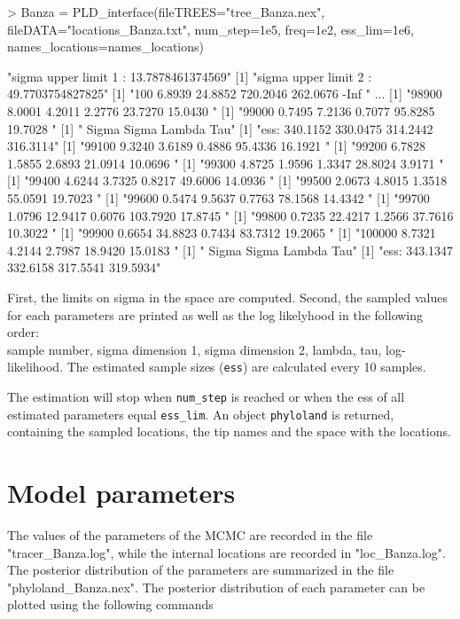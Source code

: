 \documentclass[a4paper]{article}
\begin{document}
\begin{Schunk}
\begin{Sinput}
> Banza = PLD_interface(fileTREES="tree_Banza.nex", fileDATA="locations_Banza.txt",
 num_step=1e5, freq=1e2, ess_lim=1e6, names_locations=names_locations)
\end{Sinput}

\begin{Soutput}
[1] "sigma upper limit 1 : 13.7878461374569"
[1] "sigma upper limit 2 : 49.7703754827825"
[1] "100     6.8939     24.8852     720.2046     262.0676     -Inf    "
...
[1] "98900     8.0001     4.2011     2.2776     23.7270     15.0430    "
[1] "99000     0.7495     7.2136     0.7077     95.8285     19.7028    "
[1] "             Sigma        Sigma        Lambda      Tau"
[1] "ess:     340.1152     330.0475     314.2442    316.3114"
[1] "99100     9.3240     3.6189     0.4886     95.4336     16.1921    "
[1] "99200     6.7828     1.5855     2.6893     21.0914     10.0696    "
[1] "99300     4.8725     1.9596     1.3347     28.8024     3.9171    "
[1] "99400     4.6244     3.7325     0.8217     49.6006     14.0936    "
[1] "99500     2.0673     4.8015     1.3518     55.0591     19.7023    "
[1] "99600     0.5474     9.5637     0.7763     78.1568     14.4342    "
[1] "99700     1.0796     12.9417     0.6076     103.7920     17.8745    "
[1] "99800     0.7235     22.4217     1.2566     37.7616     10.3022    "
[1] "99900     0.6654     34.8823     0.7434     83.7312     19.2065    "
[1] "100000     8.7321     4.2144     2.7987     18.9420     15.0183    "
[1] "             Sigma        Sigma        Lambda      Tau"
[1] "ess:     343.1347     332.6158     317.5541    319.5934"
\end{Soutput}
\end{Schunk}

First, the limits on sigma in the space are computed.
Second, the sampled values for each parameters are printed as well as the log likelyhood in the following order:\\
sample number, sigma dimension 1, sigma dimension 2, lambda, tau, log-likelihood.
The estimated sample sizes (\texttt{ess}) are calculated every 10 samples.

The estimation will stop when \texttt{num\_step} is reached or when the ess of all estimated parameters equal \texttt{ess\_lim}.
An object \texttt{phyloland} is returned, containing the sampled locations, the tip names and the space with the locations.

\newpage
\section{Model parameters}
\hspace{12pt} The values of the parameters of the MCMC are recorded in the file "tracer\_Banza.log", while the internal locations are recorded in "loc\_Banza.log".
The posterior distribution of the parameters are summarized in the file "phyloland\_Banza.nex".
The posterior distribution of each parameter can be plotted using the following commands
\end{document}
